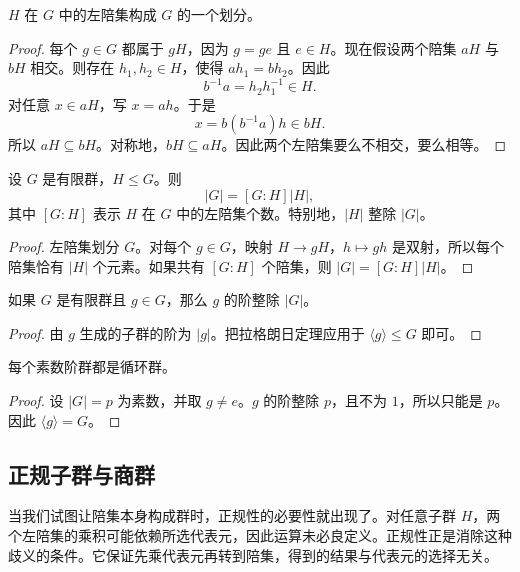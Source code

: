 \begin{proposition}[陪集划分群]
$H$ 在 $G$ 中的左陪集构成 $G$ 的一个划分。
\end{proposition}

\begin{proof}
每个 $g\in G$ 都属于 $gH$，因为 $g=ge$ 且 $e\in H$。现在假设两个陪集 $aH$ 与 $bH$ 相交。则存在 $h_1,h_2\in H$，使得 $ah_1=bh_2$。因此
\[
    b^{-1}a=h_2h_1^{-1}\in H.
\]
对任意 $x\in aH$，写 $x=ah$。于是
\[
    x=b(b^{-1}a)h\in bH.
\]
所以 $aH\subseteq bH$。对称地，$bH\subseteq aH$。因此两个左陪集要么不相交，要么相等。
\end{proof}

\begin{theorem}[拉格朗日定理]
设 $G$ 是有限群，$H\leq G$。则
\[
    |G|=[G:H]|H|,
\]
其中 $[G:H]$ 表示 $H$ 在 $G$ 中的左陪集个数。特别地，$|H|$ 整除 $|G|$。
\end{theorem}

\begin{proof}
左陪集划分 $G$。对每个 $g\in G$，映射 $H\to gH$，$h\mapsto gh$ 是双射，所以每个陪集恰有 $|H|$ 个元素。如果共有 $[G:H]$ 个陪集，则 $|G|=[G:H]|H|$。
\end{proof}

\begin{corollary}
如果 $G$ 是有限群且 $g\in G$，那么 $g$ 的阶整除 $|G|$。
\end{corollary}

\begin{proof}
由 $g$ 生成的子群的阶为 $|g|$。把拉格朗日定理应用于 $\langle g\rangle\leq G$ 即可。
\end{proof}

\begin{corollary}
每个素数阶群都是循环群。
\end{corollary}

\begin{proof}
设 $|G|=p$ 为素数，并取 $g\neq e$。$g$ 的阶整除 $p$，且不为 $1$，所以只能是 $p$。因此 $\langle g\rangle=G$。
\end{proof}

\subsection{正规子群与商群}


当我们试图让陪集本身构成群时，正规性的必要性就出现了。对任意子群 $H$，两个左陪集的乘积可能依赖所选代表元，因此运算未必良定义。正规性正是消除这种歧义的条件。它保证先乘代表元再转到陪集，得到的结果与代表元的选择无关。

